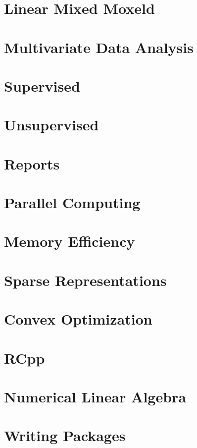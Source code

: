 \documentclass[]{book}
\begin{document}
\chapter{Linear Mixed Moxeld}\label{lme}

\chapter{Multivariate Data Analysis}\label{multivariate}

\chapter{Supervised}\label{supervised}

\chapter{Unsupervised}\label{unsupervised}

\chapter{Reports}\label{report}

\chapter{Parallel Computing}\label{parallel}

\chapter{Memory Efficiency}\label{memory}

\chapter{Sparse Representations}\label{sparse}

\chapter{Convex Optimization}\label{convex}

\chapter{RCpp}\label{rcpp}

\chapter{Numerical Linear Algebra}\label{algebra}

\chapter{Writing Packages}\label{package}


\end{document}
